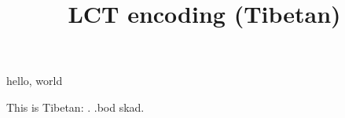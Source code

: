\documentclass{amsart}
\title{LCT encoding (Tibetan)}
\begin{document}
\maketitle

hello, world

This is Tibetan: 
{\tib \swasti. .bod skad.}
\end{document}
